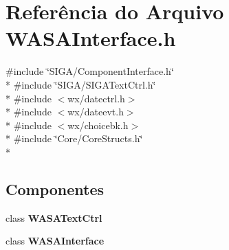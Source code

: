 \section{Referência do Arquivo W\+A\+S\+A\+Interface.\+h}
\label{_w_a_s_a_interface_8h}
{\ttfamily \#include \char`\"{}S\+I\+G\+A/\+Component\+Interface.\+h\char`\"{}}\\*
{\ttfamily \#include \char`\"{}S\+I\+G\+A/\+S\+I\+G\+A\+Text\+Ctrl.\+h\char`\"{}}\\*
{\ttfamily \#include $<$wx/datectrl.\+h$>$}\\*
{\ttfamily \#include $<$wx/dateevt.\+h$>$}\\*
{\ttfamily \#include $<$wx/choicebk.\+h$>$}\\*
{\ttfamily \#include \char`\"{}Core/\+Core\+Structs.\+h\char`\"{}}\\*
\subsection*{Componentes}
\begin{DoxyCompactItemize}
\item 
class {\bf W\+A\+S\+A\+Text\+Ctrl}
\item 
class {\bf W\+A\+S\+A\+Interface}
\end{DoxyCompactItemize}
